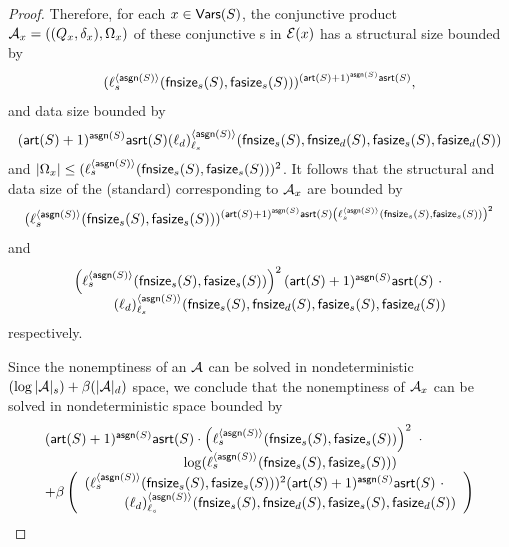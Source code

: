 \begin{proof}
Therefore, for each $x \in \mathsf{Vars}(S)$, the conjunctive product \SA{} $\mathcal{A}_x=((Q_x, \delta_x), \Omega_x)$ of these conjunctive \SA{}s  in $\mathcal{E}(x)$ has a structural size bounded by 
%
$$(\ell^{\langle \mathsf{asgn}(S) \rangle}_s(\mathsf{fnsize}_s(S), \mathsf{fasize}_s(S)))^{(\mathsf{art}(S)+1)^{\mathsf{asgn}(S)} \mathsf{asrt}(S)},$$
%
and data size bounded by
%
\[ (\mathsf{art}(S)+1)^{\mathsf{asgn}(S)} \mathsf{asrt}(S) (\ell_d)^{\langle  \mathsf{asgn}(S) \rangle}_{\ell_s}(\mathsf{fnsize}_s(S),\mathsf{fnsize}_d(S),  \mathsf{fasize}_s(S), \mathsf{fasize}_d(S)) \]
%
and $|\Omega_x| \le (\ell_s^{\langle \mathsf{asgn}(S) \rangle}(\mathsf{fnsize}_s(S), \mathsf{fasize}_s(S)))^2$. 
It follows that the structural and data size of the (standard) \SA{} corresponding to $\mathcal{A}_x$ are  bounded by 
%
$$(\ell^{\langle \mathsf{asgn}(S) \rangle}_s(\mathsf{fnsize}_s(S), \mathsf{fasize}_s(S)))^{(\mathsf{art}(S)+1)^{\mathsf{asgn}(S)} \mathsf{asrt}(S) \left(\ell_s^{\langle \mathsf{asgn}(S) \rangle}(\mathsf{fnsize}_s(S), \mathsf{fasize}_s(S))\right)^2}$$
%
and
$$
\begin{array}{l}
\left(\ell_s^{\langle \mathsf{asgn}(S) \rangle}(\mathsf{fnsize}_s(S), \mathsf{fasize}_s(S))\right)^2 (\mathsf{art}(S)+1)^{\mathsf{asgn}(S)} \mathsf{asrt}(S)\ \cdot  \\
\hspace{1cm}(\ell_d)^{\langle  \mathsf{asgn}(S) \rangle}_{\ell_s}(\mathsf{fnsize}_s(S),\mathsf{fnsize}_d(S),  \mathsf{fasize}_s(S), \mathsf{fasize}_d(S))
\end{array}
$$
respectively.

Since the nonemptiness of an \SA{} $\mathcal{A}$ can be solved in nondeterministic $(\log |\mathcal{A}|_s) + \beta(|\mathcal{A}|_d)$ space, we conclude that the nonemptiness of $\mathcal{A}_x$ can be solved in nondeterministic space bounded by 
{\small
$$
\begin{array}{l}
(\rcdim(S)+1)^{\rcdep(S)} \rcasrt(S) \cdot \left(\ell_s^{\langle \rcdep(S) \rangle}(\rcphi_s(S), \rcpsi_s(S))\right)^2\ \cdot \\
\hspace{3.5cm} \log (\ell^{\langle \rcdep(S) \rangle}_s(\rcphi_s(S), \rcpsi_s(S))) \\
\hfill +\beta
\left(
\begin{array}{l}
(\ell_s^{\langle \rcdep(S) \rangle}(\rcphi_s(S), \rcpsi_s(S)))^2 (\rcdim(S)+1)^{\rcdep(S)} \rcasrt(S)\ \cdot  \\
\hspace{1cm} (\ell_d)^{\langle  \rcdep(S) \rangle}_{\ell_s}(\rcphi_s(S),\rcphi_d(S),  \rcpsi_s(S), \rcpsi_d(S))
\end{array}
\right)
\end{array}
$$
}


\end{proof}
